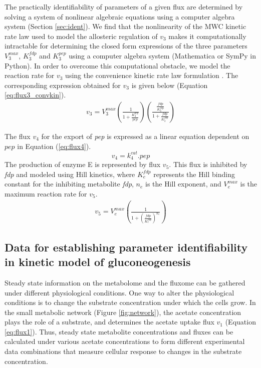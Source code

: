 \documentclass[10pt]{article}
\begin{document}
The practically identifiability of parameters of a given flux are determined by solving a system of nonlinear algebraic equations using a computer algebra system (Section \ref{sec:ident}). We find that the nonlinearity of the MWC kinetic rate law used to model the allosteric regulation of $v_3$ makes it computationally intractable for determining the closed form expressions of the three parameters $V_3^{max}$, $K_3^{fdp}$ and $K_3^{pep}$ using a computer algebra system (Mathematica or SymPy in Python). In order to overcome this computational obstacle, we model the reaction rate for $v_3$ using the convenience kinetic rate law formulation \parencite{Liebermeister2006}. The corresponding expression obtained for $v_3$ is given below (Equation \ref{eq:flux3_convkin}). 	
\begin{align}\label{eq:flux3_convkin}
v_3 = V_3^{max}\left(\frac{1}{1 + \frac{K_3^{pep}}{pep}}\right)\left(\frac{\frac{fdp}{K_3^{fdp}}}{1 + \frac{fdp}{K_3^{fdp}}}\right)
\end{align}	

The flux $v_4$ for the export of \textit{pep} is expressed as a linear equation dependent on $pep$ in Equation (\ref{eq:flux4}).
\begin{equation}\label{eq:flux4}
v_4 = k_{4}^{cat}.pep
\end{equation}		
The production of enzyme E is represented by flux $v_5$. This flux is inhibited by \textit{fdp} and modeled using Hill kinetics, where $K_e^{fdp}$ represents the Hill binding constant for the inhibiting metabolite \textit{fdp}, $n_e$ is the Hill exponent, and $V_e^{max}$ is the maximum reaction rate for $v_5$.
\begin{align}\label{eq:flux5}
v_5 = V_e^{max}\left(\frac{1}{1+\left(\frac{fdp}{K_{e}^{fdp}}\right)^{n_e}}\right)
\end{align}

\subsection{Data for establishing parameter identifiability in kinetic model of gluconeogenesis}\label{sec:experiments}
Steady state information on the metabolome and the fluxome can be gathered under different physiological conditions. One way to alter the physiological conditions is to change the substrate concentration under which the cells grow. In the small metabolic network (Figure \ref{fig:network}), the acetate concentration plays the role of a substrate, and  determines the acetate uptake flux $v_1$ (Equation \ref{eq:flux1}). Thus, steady state metabolite concentrations and fluxes can be calculated under various acetate concentrations to form different experimental data combinations that measure cellular response to changes in the substrate concentration. 
\end{document}
